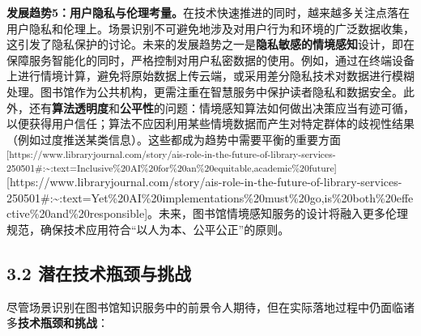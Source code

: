\documentclass[
  letterpaper,
]{scrbook}
\begin{document}
\textbf{发展趋势5：用户隐私与伦理考量。}在技术快速推进的同时，越来越多关注点落在用户隐私和伦理上。场景识别不可避免地涉及对用户行为和环境的广泛数据收集，这引发了隐私保护的讨论。未来的发展趋势之一是\textbf{隐私敏感的情境感知}设计，即在保障服务智能化的同时，严格控制对用户私密数据的使用。例如，通过在终端设备上进行情境计算，避免将原始数据上传云端，或采用差分隐私技术对数据进行模糊处理。图书馆作为公共机构，更需注重在智慧服务中保护读者隐私和数据安全。此外，还有\textbf{算法透明度}和\textbf{公平性}的问题：情境感知算法如何做出决策应当有迹可循，以便获得用户信任；算法不应因利用某些情境数据而产生对特定群体的歧视性结果（例如过度推送某类信息）。这些都成为趋势中需要平衡的重要方面\textsuperscript{{[}https://www.libraryjournal.com/story/ais-role-in-the-future-of-library-services-250501\#:\textasciitilde:text=Inclusive\%20AI\%20for\%20an\%20equitable,academic\%20future{]}}{[}https://www.libraryjournal.com/story/ais-role-in-the-future-of-library-services-250501\#:\textasciitilde:text=Yet\%20AI\%20implementations\%20must\%20go,is\%20both\%20effective\%20and\%20responsible{]}。未来，图书馆情境感知服务的设计将融入更多伦理规范，确保技术应用符合``以人为本、公平公正''的原则。

\subsection{3.2
潜在技术瓶颈与挑战}\label{ux6f5cux5728ux6280ux672fux74f6ux9888ux4e0eux6311ux6218}

尽管场景识别在图书馆知识服务中的前景令人期待，但在实际落地过程中仍面临诸多\textbf{技术瓶颈和挑战}：
\end{document}
